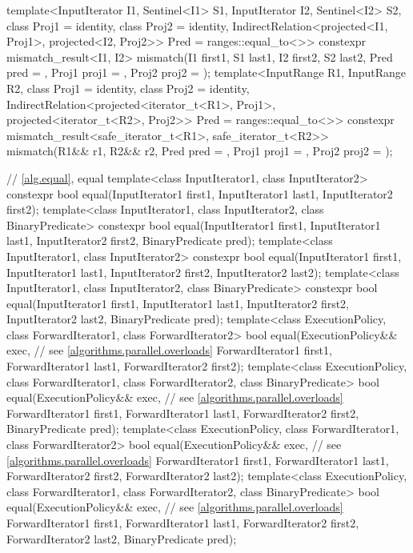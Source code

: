 \begin{codeblock}
{{    template<InputIterator I1, Sentinel<I1> S1, InputIterator I2, Sentinel<I2> S2,
        class Proj1 = identity, class Proj2 = identity,
        IndirectRelation<projected<I1, Proj1>, projected<I2, Proj2>> Pred = ranges::equal_to<>>
      constexpr mismatch_result<I1, I2>
        mismatch(I1 first1, S1 last1, I2 first2, S2 last2, Pred pred = {},
                 Proj1 proj1 = {}, Proj2 proj2 = {});
    template<InputRange R1, InputRange R2,
        class Proj1 = identity, class Proj2 = identity,
        IndirectRelation<projected<iterator_t<R1>, Proj1>,
          projected<iterator_t<R2>, Proj2>> Pred = ranges::equal_to<>>
      constexpr mismatch_result<safe_iterator_t<R1>, safe_iterator_t<R2>>
        mismatch(R1&& r1, R2&& r2, Pred pred = {},
                 Proj1 proj1 = {}, Proj2 proj2 = {});
  }

  // \ref{alg.equal}, equal
  template<class InputIterator1, class InputIterator2>
    constexpr bool equal(InputIterator1 first1, InputIterator1 last1,
                         InputIterator2 first2);
  template<class InputIterator1, class InputIterator2, class BinaryPredicate>
    constexpr bool equal(InputIterator1 first1, InputIterator1 last1,
                         InputIterator2 first2, BinaryPredicate pred);
  template<class InputIterator1, class InputIterator2>
    constexpr bool equal(InputIterator1 first1, InputIterator1 last1,
                         InputIterator2 first2, InputIterator2 last2);
  template<class InputIterator1, class InputIterator2, class BinaryPredicate>
    constexpr bool equal(InputIterator1 first1, InputIterator1 last1,
                         InputIterator2 first2, InputIterator2 last2,
                         BinaryPredicate pred);
  template<class ExecutionPolicy, class ForwardIterator1, class ForwardIterator2>
    bool equal(ExecutionPolicy&& exec, // see \ref{algorithms.parallel.overloads}
               ForwardIterator1 first1, ForwardIterator1 last1,
               ForwardIterator2 first2);
  template<class ExecutionPolicy, class ForwardIterator1, class ForwardIterator2,
           class BinaryPredicate>
    bool equal(ExecutionPolicy&& exec, // see \ref{algorithms.parallel.overloads}
               ForwardIterator1 first1, ForwardIterator1 last1,
               ForwardIterator2 first2, BinaryPredicate pred);
  template<class ExecutionPolicy, class ForwardIterator1, class ForwardIterator2>
    bool equal(ExecutionPolicy&& exec, // see \ref{algorithms.parallel.overloads}
               ForwardIterator1 first1, ForwardIterator1 last1,
               ForwardIterator2 first2, ForwardIterator2 last2);
  template<class ExecutionPolicy, class ForwardIterator1, class ForwardIterator2,
           class BinaryPredicate>
    bool equal(ExecutionPolicy&& exec, // see \ref{algorithms.parallel.overloads}
               ForwardIterator1 first1, ForwardIterator1 last1,
               ForwardIterator2 first2, ForwardIterator2 last2,
               BinaryPredicate pred);

}
\end{codeblock}
